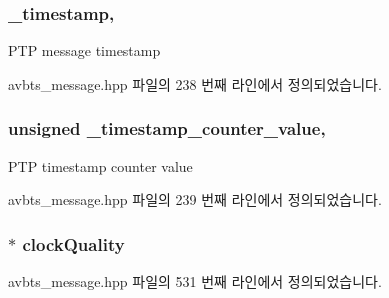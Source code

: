 \subsubsection[{\texorpdfstring{\+\_\+timestamp}{_timestamp}}]{ \+\_\+timestamp\hspace{0.3cm}{\ttfamily [protected]}, {\ttfamily [inherited]}}\hypertarget{class_p_t_p_message_common_aeafd115d5626f0602ab067a502d83d3e}{}\label{class_p_t_p_message_common_aeafd115d5626f0602ab067a502d83d3e}
P\+TP message timestamp 

avbts\+\_\+message.\+hpp 파일의 238 번째 라인에서 정의되었습니다.

\subsubsection[{\texorpdfstring{\+\_\+timestamp\+\_\+counter\+\_\+value}{_timestamp_counter_value}}]{\setlength{\rightskip}{0pt plus 5cm}unsigned \+\_\+timestamp\+\_\+counter\+\_\+value\hspace{0.3cm}{\ttfamily [protected]}, {\ttfamily [inherited]}}\hypertarget{class_p_t_p_message_common_a9d90ca571f84fe3633c7539e24783190}{}\label{class_p_t_p_message_common_a9d90ca571f84fe3633c7539e24783190}
P\+TP timestamp counter value 

avbts\+\_\+message.\+hpp 파일의 239 번째 라인에서 정의되었습니다.

\subsubsection[{\texorpdfstring{clock\+Quality}{clockQuality}}]{$\ast$ clock\+Quality\hspace{0.3cm}{\ttfamily [private]}}\hypertarget{class_p_t_p_message_announce_ab34e3b1a4a03f5cf7db079194cea2bf3}{}\label{class_p_t_p_message_announce_ab34e3b1a4a03f5cf7db079194cea2bf3}


avbts\+\_\+message.\+hpp 파일의 531 번째 라인에서 정의되었습니다.


